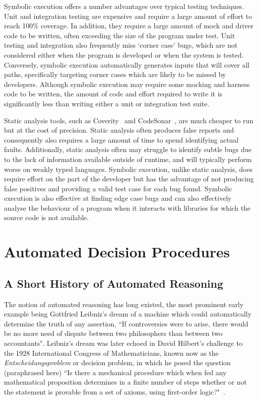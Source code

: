 \documentclass[]{final_report}
\begin{document}
Symbolic execution offers a number advantages over typical testing techniques. Unit and integration testing are expensive and require a large amount of effort to reach 100\% coverage. In addition, they require a large amount of mock and driver code to be written, often exceeding the size of the program under test. Unit testing and integration also frequently miss `corner case' bugs, which are not considered either when the program is developed or when the system is tested. Conversely, symbolic execution automatically generates inputs that will cover all paths, specifically targeting corner cases which are likely to be missed by developers. Although symbolic execution may require some mocking and harness code to be written, the amount of code and effort required to write it is significantly less than writing either a unit or integration test suite.

Static analysis tools, such as Coverity~\cite{almossawi2006analysis,Bessey:2010:FBL:1646353.1646374} and CodeSonar~\cite{jetley2008static}, are much cheaper to run but at the cost of precision. Static analysis often produces false reports and consequently also requires a large amount of time to spend identifying actual faults. Additionally, static analysis often may struggle to identify subtle bugs due to the lack of information available outside of runtime, and will typically perform worse on weakly typed languages. Symbolic execution, unlike static analysis, does require effort on the part of the developer but has the advantage of not producing false positives and providing a valid test case for each bug found. Symbolic execution is also effective at finding edge case bugs and can also effectively analyse the behaviour of a program when it interacts with libraries for which the source code is not available.

\chapter{Automated Decision Procedures}

\section{A Short History of Automated Reasoning}
The notion of automated reasoning has long existed, the most prominent early example being Gottfried Leibniz's dream of a machine which could automatically determine the truth of any assertion, ``If controversies were to arise, there would be no more need of dispute between two philosophers than between two accountants". Leibniz's dream was later echoed in David Hilbert's challenge to the 1928 International Congress of Mathematicians, known now as the \textit{Entscheidungsproblem} or decision problem, in which he posed the question (paraphrased here) ``Is there a mechanical procedure which when fed any mathematical proposition determines in a finite number of steps whether or not the statement is provable from a set of axioms, using first-order logic?"~\cite{smtwheredowegofromhere, automatedreasoningbooklet2004}.
\end{document}
